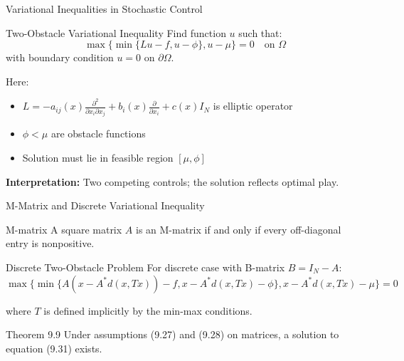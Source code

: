 \documentclass[aspectratio=169,10pt]{beamer}
\begin{document}
\begin{frame}{Variational Inequalities in Stochastic Control}
    \begin{block}{Two-Obstacle Variational Inequality}
        Find function $u$ such that:
        \[\max\{\min\{Lu - f, u - \phi\}, u - \mu\} = 0 \quad \text{on } \Omega\]
        with boundary condition $u = 0$ on $\partial\Omega$.

        \smallskip

        Here:
        \begin{itemize}
            \item $L = -a_{ij}(x)\frac{\partial^2}{\partial x_i \partial x_j} + b_i(x)\frac{\partial}{\partial x_i} + c(x)I_N$ is elliptic operator
            \item $\phi < \mu$ are obstacle functions
            \item Solution must lie in feasible region $[\mu, \phi]$
        \end{itemize}
    \end{block}

    \vspace{0.3cm}

    \textbf{Interpretation:} Two competing controls; the solution reflects optimal play.
\end{frame}

\begin{frame}{M-Matrix and Discrete Variational Inequality}
    \begin{definition}{M-matrix}
        A square matrix $A$ is an M-matrix if and only if every off-diagonal entry is nonpositive.
    \end{definition}

    \vspace{0.3cm}

    \begin{block}{Discrete Two-Obstacle Problem}
        For discrete case with B-matrix $B = I_N - A$:
        \[\max\{\min\{A(x - A^*d(x, Tx)) - f, x - A^*d(x, Tx) - \phi\}, x - A^*d(x, Tx) - \mu\} = 0\]

        where $T$ is defined implicitly by the min-max conditions.
    \end{block}

    \vspace{0.3cm}

    \begin{block}{Theorem 9.9}
        Under assumptions (9.27) and (9.28) on matrices, a solution to equation (9.31) exists.
    \end{block}
\end{frame}
\end{document}
